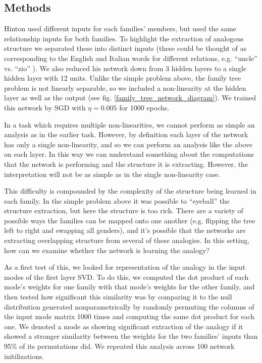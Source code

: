 \documentclass[10pt,letterpaper]{article}
\begin{document}
\subsection{Methods}
Hinton used different inputs for each families' members, but used the same relationship inputs for both families. To highlight the extraction of analogous structure we separated these into distinct inputs (these could be thought of as corresponding to the English and Italian words for different relations, e.g. ``uncle'' vs. ``zio'' ). We also reduced his network down from 3 hidden layers to a single hidden layer with 12 units. Unlike the simple problem above, the family tree problem is not linearly separable, so we included a non-linearity at the hidden layer as well as the output (see fig. \ref{family_tree_network_diagram}). We trained this network by SGD with \(\eta = 0.005\) for 1000 epochs. \par 
In a task which requires multiple non-linearities, we cannot perform as simple an analysis as in the earlier task. However, by definition each layer of the network has only a single non-linearity, and so we can perform an analysis like the above on each layer. In this way we can understand something about the computations that the network is performing and the structure it is extracting. However, the interpretation will not be as simple as in the single non-linearity case. \par
This difficulty is compounded by the complexity of the structure being learned in each family. In the simple problem above it was possible to ``eyeball'' the structure extraction, but here the structure is too rich. There are a variety of possible ways the families can be mapped onto one another (e.g. flipping the tree left to right and swapping all genders), and it's possible that the networks are extracting overlapping structure from several of these analogies. In this setting, how can we examine whether the network is learning the analogy? \par
As a first test of this, we looked for representation of the analogy in the input modes of the first layer SVD. To do this, we computed the dot product of each mode's weights for one family with that mode's weights for the other family, and then tested how significant this similarity was by comparing it to the null distribution generated nonparametrically by randomly permuting the columns of the input mode matrix 1000 times and computing the same dot product for each one. We denoted a mode as showing significant extraction of the analogy if it showed a stronger similarity between the weights for the two families' inputs than 95\% of its permutations did. We repeated this analysis across 100 network initilizations.  \par
\end{document}
